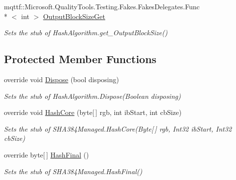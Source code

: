 \begin{DoxyCompactItemize}
mqttf\-::\-Microsoft.\-Quality\-Tools.\-Testing.\-Fakes.\-Fakes\-Delegates.\-Func\\*
$<$ int $>$ \hyperlink{class_system_1_1_security_1_1_cryptography_1_1_fakes_1_1_stub_s_h_a384_managed_ab3683f4fda67a36bfb872777acdb0bc1}{Output\-Block\-Size\-Get}
\begin{DoxyCompactList}\small\item\em Sets the stub of Hash\-Algorithm.\-get\-\_\-\-Output\-Block\-Size()\end{DoxyCompactList}\end{DoxyCompactItemize}
\subsection*{Protected Member Functions}
\begin{DoxyCompactItemize}
\item 
override void \hyperlink{class_system_1_1_security_1_1_cryptography_1_1_fakes_1_1_stub_s_h_a384_managed_ab89969785a9f52ffb374e670c77ad767}{Dispose} (bool disposing)
\begin{DoxyCompactList}\small\item\em Sets the stub of Hash\-Algorithm.\-Dispose(\-Boolean disposing)\end{DoxyCompactList}\item 
override void \hyperlink{class_system_1_1_security_1_1_cryptography_1_1_fakes_1_1_stub_s_h_a384_managed_a0f059f7386f41f706c1de909a5a47bbc}{Hash\-Core} (byte\mbox{[}$\,$\mbox{]} rgb, int ib\-Start, int cb\-Size)
\begin{DoxyCompactList}\small\item\em Sets the stub of S\-H\-A384\-Managed.\-Hash\-Core(\-Byte\mbox{[}$\,$\mbox{]} rgb, Int32 ib\-Start, Int32 cb\-Size)\end{DoxyCompactList}\item 
override byte\mbox{[}$\,$\mbox{]} \hyperlink{class_system_1_1_security_1_1_cryptography_1_1_fakes_1_1_stub_s_h_a384_managed_ad15216ce6cb59343f57f59f09bcf139c}{Hash\-Final} ()
\begin{DoxyCompactList}\small\item\em Sets the stub of S\-H\-A384\-Managed.\-Hash\-Final()\end{DoxyCompactList}\end{DoxyCompactItemize}
